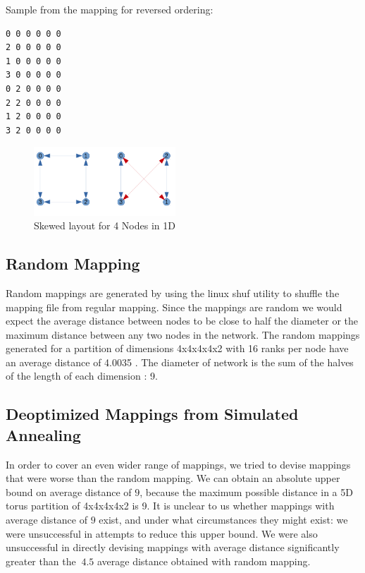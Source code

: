 \documentclass{acm_proc_article-sp}
\begin{document}
Sample from the mapping for reversed ordering:
\begin{lstlisting}[frame=lines, basicstyle=\ttfamily,columns=fixed]
0 0 0 0 0 0
2 0 0 0 0 0
1 0 0 0 0 0
3 0 0 0 0 0
0 2 0 0 0 0
2 2 0 0 0 0
1 2 0 0 0 0
3 2 0 0 0 0
\end{lstlisting}


\label{sect:Skewed mapping in 1D}
\begin{figure}
  \center
  \includegraphics[width=0.475\textwidth]{skewed_layout_cropped.pdf}
  \caption{Skewed layout for 4 Nodes in 1D}
    \label{fig:Skewed layout for 4 Nodes in 1D}
\end{figure}

\subsection{Random Mapping}
\label{sect:random}

Random mappings are generated by using the linux shuf utility to shuffle the mapping file from regular mapping.
Since the mappings are random we would expect the average distance between nodes to be close to half the diameter
or the maximum distance between any two nodes in the network. The random mappings generated for a partition of
dimensions 4x4x4x4x2 with 16 ranks per node have an average distance of 4.0035 .
The diameter of network is the sum of the halves of the length of each dimension : 9.


\subsection{Deoptimized Mappings from Simulated Annealing}
In order to cover an even wider range of mappings, we tried to
devise mappings that were worse than the random mapping.
We can obtain an absolute upper bound on average distance of
$9$, because the maximum possible distance in a 5D torus
partition of 4x4x4x4x2 is 9.  It is unclear to us whether
mappings with average distance of $9$ exist, and under what
circumstances they might exist: we were unsuccessful in
attempts to reduce this upper bound.  We were also
unsuccessful in directly devising mappings
with average distance significantly greater than the $~4.5$ average
distance obtained with random mapping.
\end{document}
